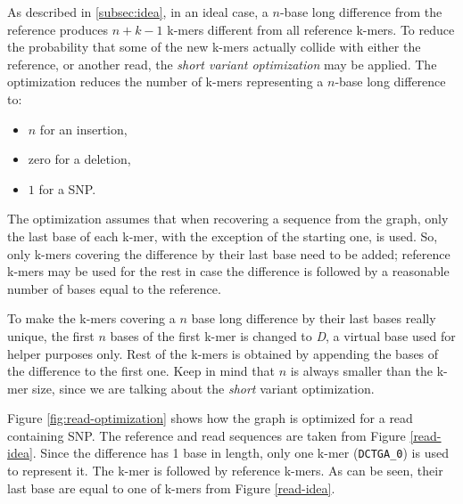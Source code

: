 As described in \ref{subsec:idea}, in an ideal case, a $n$-base long difference from the reference produces $n + k - 1$ k-mers different from all reference k-mers. To reduce the probability that some of the new k-mers actually collide with either the reference, or another read, the \textit{short variant optimization} may be applied. The optimization reduces the number of k-mers representing a $n$-base long difference to:
\begin{itemize}
\item $n$ for an insertion,
\item zero for a deletion,
\item $1$ for a SNP.
\end{itemize}
The optimization assumes that when recovering a sequence from the graph, only the last base of each k-mer, with the exception of the starting one, is used. So, only k-mers covering the difference by their last base need to be added; reference k-mers may be used for the rest in case the difference is followed by a reasonable number of bases equal to the reference. 

To make the k-mers covering a $n$ base long difference by their last bases really unique, the first $n$ bases of the first k-mer is changed to \textit{D}, a virtual base used for helper purposes only. Rest of the k-mers is obtained by appending the bases of the difference to the first one. Keep in mind that $n$ is always smaller than the k-mer size, since we are talking about the \textit{short} variant optimization.

Figure \ref{fig:read-optimization} shows how the graph is optimized for a read containing SNP. The reference and read sequences are taken from Figure \ref{read-idea}. Since the difference has 1 base in length, only one k-mer (\texttt{DCTGA\_0}) is used to represent it. The k-mer is followed by reference k-mers. As can be seen, their last base are equal to one of k-mers from Figure \ref{read-idea}.

